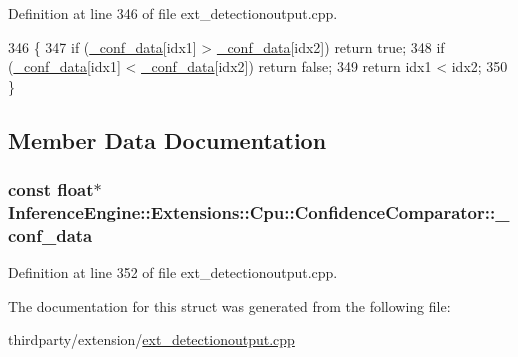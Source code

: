 Definition at line 346 of file ext\+\_\+detectionoutput.\+cpp.


\begin{DoxyCode}
346                                         \{
347         \textcolor{keywordflow}{if} (\hyperlink{structInferenceEngine_1_1Extensions_1_1Cpu_1_1ConfidenceComparator_a4799b1ce7bed1246a75811fdf76205c6}{\_conf\_data}[idx1] > \hyperlink{structInferenceEngine_1_1Extensions_1_1Cpu_1_1ConfidenceComparator_a4799b1ce7bed1246a75811fdf76205c6}{\_conf\_data}[idx2]) \textcolor{keywordflow}{return} \textcolor{keyword}{true};
348         \textcolor{keywordflow}{if} (\hyperlink{structInferenceEngine_1_1Extensions_1_1Cpu_1_1ConfidenceComparator_a4799b1ce7bed1246a75811fdf76205c6}{\_conf\_data}[idx1] < \hyperlink{structInferenceEngine_1_1Extensions_1_1Cpu_1_1ConfidenceComparator_a4799b1ce7bed1246a75811fdf76205c6}{\_conf\_data}[idx2]) \textcolor{keywordflow}{return} \textcolor{keyword}{false};
349         \textcolor{keywordflow}{return} idx1 < idx2;
350     \}
\end{DoxyCode}


\subsection{Member Data Documentation}
\subsubsection[{\texorpdfstring{\+\_\+conf\+\_\+data}{_conf_data}}]{\setlength{\rightskip}{0pt plus 5cm}const float$\ast$ Inference\+Engine\+::\+Extensions\+::\+Cpu\+::\+Confidence\+Comparator\+::\+\_\+conf\+\_\+data}\hypertarget{structInferenceEngine_1_1Extensions_1_1Cpu_1_1ConfidenceComparator_a4799b1ce7bed1246a75811fdf76205c6}{}\label{structInferenceEngine_1_1Extensions_1_1Cpu_1_1ConfidenceComparator_a4799b1ce7bed1246a75811fdf76205c6}


Definition at line 352 of file ext\+\_\+detectionoutput.\+cpp.



The documentation for this struct was generated from the following file\+:\begin{DoxyCompactItemize}
\item 
thirdparty/extension/\hyperlink{ext__detectionoutput_8cpp}{ext\+\_\+detectionoutput.\+cpp}\end{DoxyCompactItemize}
